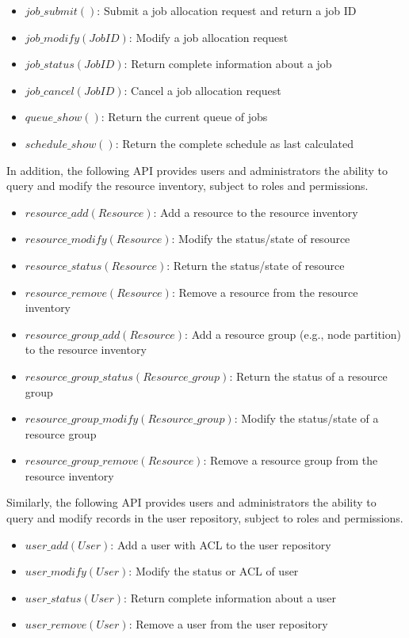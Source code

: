 \begin{itemize}
\item{$job\_submit()$: Submit a job allocation request and return a
  job ID}
\item{$job\_modify(JobID)$: Modify a job allocation request}
\item{$job\_status(JobID)$: Return complete information about a job}
\item{$job\_cancel(JobID)$: Cancel a job allocation request}
\item{$queue\_show()$: Return the current queue of jobs}
\item{$schedule\_show()$: Return the complete schedule as last
  calculated}
\end{itemize}

In addition, the following API provides users and administrators the
ability to query and modify the resource inventory, subject to roles
and permissions.

\begin{itemize}
\item{$resource\_add(Resource)$: Add a resource to the resource inventory}
\item{$resource\_modify(Resource)$: Modify the status/state of resource}
\item{$resource\_status(Resource)$: Return the status/state of resource}
\item{$resource\_remove(Resource)$: Remove a resource from the resource inventory}
\item{$resource\_group\_add(Resource)$: Add a resource group (e.g., node partition) to the resource inventory}
\item{$resource\_group\_status(Resource\_group)$: Return the status of a resource group}
\item{$resource\_group\_modify(Resource\_group)$: Modify the status/state of a resource group}
\item{$resource\_group\_remove(Resource)$: Remove a resource group from the resource inventory}
\end{itemize}

Similarly, the following API provides users and administrators the
ability to query and modify records in the user repository, subject to
roles and permissions.

\begin{itemize}
\item{$user\_add(User)$: Add a user with ACL to the user repository}
\item{$user\_modify(User)$: Modify the status or ACL of user}
\item{$user\_status(User)$: Return complete information about a user}
\item{$user\_remove(User)$: Remove a user from the user repository}
\end{itemize}

